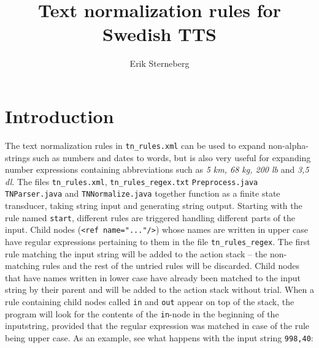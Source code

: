 \documentclass[10pt,a4paper]{article}
\author{Erik Sterneberg}
\title{Text normalization rules for Swedish TTS}
\begin{document}
\maketitle
\date
\newpage
\newpage
\newpage
\tableofcontents
\newpage
\newpage
\newpage

\section{Introduction}
The text normalization rules in \verb!tn_rules.xml! can be used to expand non-alpha-strings such as numbers and dates to words, but is also very useful for expanding number expressions containing abbreviations such as \textit{5 km, 68 kg, 200 lb} and \textit{3,5 dl}. The files \verb!tn_rules.xml!, \verb!tn_rules_regex.txt! \verb!Preprocess.java! \verb!TNParser.java! and \verb!TNNormalize.java! together function as a finite state transducer, taking string input and generating string output. Starting with the rule named \verb!start!, different rules are triggered handling different parts of the input. Child nodes (\verb!<ref name="..."/>!) whose names are written in upper case have regular expressions pertaining to them in the file \verb!tn_rules_regex!. The first rule matching the input string will be added to the action stack -- the non-matching rules and the rest of the untried rules will be discarded. Child nodes that have names written in lower case have already been matched to the input string by their parent and will be added to the action stack without trial. When a rule containing child nodes called \verb!in! and \verb!out! appear on top of the stack, the program will look for the contents of the \verb!in!-node in the beginning of the inputstring, provided that the regular expression was matched in case of the rule being upper case. As an example, see what happens with the input string \verb!998,40!:\\
\end{document}
